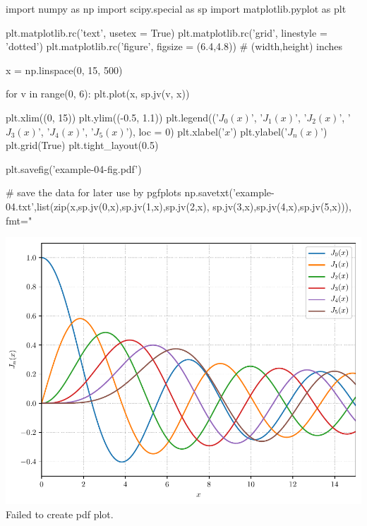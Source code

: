 \documentclass[12pt]{pylatex}
\begin{document}
\begin{minipage}[t]{0.60\textwidth}
\begin{python}
   import numpy as np
   import scipy.special as sp
   import matplotlib.pyplot as plt

   plt.matplotlib.rc('text', usetex = True)
   plt.matplotlib.rc('grid', linestyle = 'dotted')
   plt.matplotlib.rc('figure', figsize = (6.4,4.8)) # (width,height) inches

   x = np.linspace(0, 15, 500)

   for v in range(0, 6):
       plt.plot(x, sp.jv(v, x))

   plt.xlim((0, 15))
   plt.ylim((-0.5, 1.1))
   plt.legend(('${J}_0(x)$', '${J}_1(x)$', '${J}_2(x)$',
               '${J}_3(x)$', '${J}_4(x)$', '${J}_5(x)$'), loc = 0)
   plt.xlabel('$x$')
   plt.ylabel('${J}_n(x)$')
   plt.grid(True)
   plt.tight_layout(0.5)

   plt.savefig('example-04-fig.pdf')

   # save the data for later use by pgfplots
   np.savetxt('example-04.txt',list(zip(x,sp.jv(0,x),sp.jv(1,x),sp.jv(2,x),
                                          sp.jv(3,x),sp.jv(4,x),sp.jv(5,x))),
                               fmt="%
\end{python}
\end{minipage}
\hskip 0.25cm
\begin{minipage}[t]{0.35\textwidth}
\begin{latex}
   \begin{minipage}{\textwidth}
      \centering
      {\includegraphics[width=6.4in]
         {example-04-fig.pdf}}{Failed to create pdf plot.}
   \end{minipage}
\end{latex}
\end{minipage}
\end{document}
